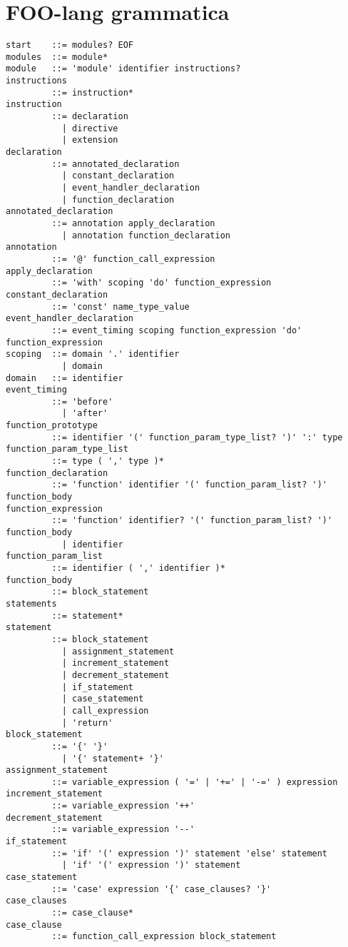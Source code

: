 
\chapter{FOO-lang grammatica}
\label{appendix:foo-lang-grammar}

\begin{verbatim}
start    ::= modules? EOF
modules  ::= module*
module   ::= 'module' identifier instructions?
instructions
         ::= instruction*
instruction
         ::= declaration
           | directive
           | extension
declaration
         ::= annotated_declaration
           | constant_declaration
           | event_handler_declaration
           | function_declaration
annotated_declaration
         ::= annotation apply_declaration
           | annotation function_declaration
annotation
         ::= '@' function_call_expression
apply_declaration
         ::= 'with' scoping 'do' function_expression
constant_declaration
         ::= 'const' name_type_value
event_handler_declaration
         ::= event_timing scoping function_expression 'do' function_expression
scoping  ::= domain '.' identifier
           | domain
domain   ::= identifier
event_timing
         ::= 'before'
           | 'after'
function_prototype
         ::= identifier '(' function_param_type_list? ')' ':' type
function_param_type_list
         ::= type ( ',' type )*
function_declaration
         ::= 'function' identifier '(' function_param_list? ')' function_body
function_expression
         ::= 'function' identifier? '(' function_param_list? ')' function_body
           | identifier
function_param_list
         ::= identifier ( ',' identifier )*
function_body
         ::= block_statement
statements
         ::= statement*
statement
         ::= block_statement
           | assignment_statement
           | increment_statement
           | decrement_statement
           | if_statement
           | case_statement
           | call_expression
           | 'return'
block_statement
         ::= '{' '}'
           | '{' statement+ '}'
assignment_statement
         ::= variable_expression ( '=' | '+=' | '-=' ) expression
increment_statement
         ::= variable_expression '++'
decrement_statement
         ::= variable_expression '--'
if_statement
         ::= 'if' '(' expression ')' statement 'else' statement
           | 'if' '(' expression ')' statement
case_statement
         ::= 'case' expression '{' case_clauses? '}'
case_clauses
         ::= case_clause*
case_clause
         ::= function_call_expression block_statement

\end{verbatim}
